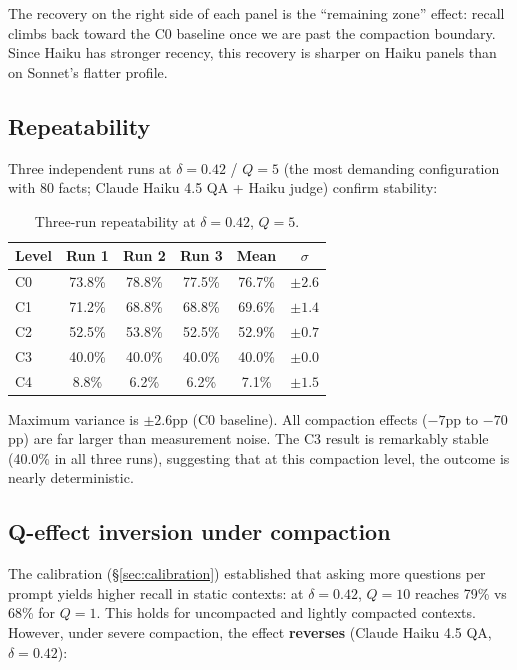 The recovery on the right side of each panel is the ``remaining zone''
effect: recall climbs back toward the C0 baseline once we are past the
compaction boundary. Since Haiku has stronger recency, this recovery is
sharper on Haiku panels than on Sonnet's flatter profile.

\subsection{Repeatability}
\label{sec:singlepass-repeatability}

Three independent runs at $\delta=0.42$ / $Q=5$ (the most demanding configuration
with 80 facts; Claude Haiku 4.5 QA + Haiku judge) confirm stability:

\begin{table}[h]
\centering
\caption{Three-run repeatability at $\delta=0.42$, $Q=5$.}
\label{tab:repeatability}
\begin{tabular}{lccccc}
\toprule
Level & Run 1 & Run 2 & Run 3 & Mean & $\sigma$ \\
\midrule
C0 & 73.8\% & 78.8\% & 77.5\% & 76.7\% & $\pm 2.6$ \\
C1 & 71.2\% & 68.8\% & 68.8\% & 69.6\% & $\pm 1.4$ \\
C2 & 52.5\% & 53.8\% & 52.5\% & 52.9\% & $\pm 0.7$ \\
C3 & 40.0\% & 40.0\% & 40.0\% & 40.0\% & $\pm 0.0$ \\
C4 & 8.8\%  & 6.2\%  & 6.2\%  & 7.1\%  & $\pm 1.5$ \\
\bottomrule
\end{tabular}
\end{table}

Maximum variance is $\pm 2.6$pp (C0 baseline). All compaction effects ($-7$pp to
$-70$pp) are far larger than measurement noise. The C3 result is remarkably
stable (40.0\% in all three runs), suggesting that at this compaction level,
the outcome is nearly deterministic.

\subsection{Q-effect inversion under compaction}
\label{sec:q-inversion}

The calibration (\S\ref{sec:calibration}) established that asking more questions per prompt yields
higher recall in static contexts: at $\delta=0.42$, $Q=10$ reaches 79\% vs 68\% for $Q=1$.
This holds for uncompacted and lightly compacted contexts. However, under
severe compaction, the effect \textbf{reverses} (Claude Haiku 4.5 QA, $\delta=0.42$):

